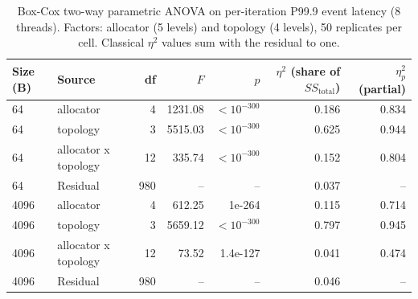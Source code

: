 \begin{table}[!htbp]
\centering
\footnotesize
\setlength{\tabcolsep}{3pt}
\caption{Box-Cox two-way parametric ANOVA on per-iteration P99.9 event latency (8 threads). Factors: allocator (5 levels) and topology (4 levels), 50 replicates per cell. Classical $\eta^2$ values sum with the residual to one.}
\label{tab:anova}
\begin{tabular}{llrrrrr}
\toprule
Size (B) & Source & df & $F$ & $p$ & $\eta^2$ (share of $SS_{\mathrm{total}}$) & $\eta_p^2$ (partial)\\
\midrule
64 & allocator & 4 & 1231.08 & $<10^{-300}$ & 0.186 & 0.834 \\
64 & topology & 3 & 5515.03 & $<10^{-300}$ & 0.625 & 0.944 \\
64 & allocator x topology & 12 & 335.74 & $<10^{-300}$ & 0.152 & 0.804 \\
64 & Residual & 980 & -- & -- & 0.037 & -- \\
4096 & allocator & 4 & 612.25 & 1e-264 & 0.115 & 0.714 \\
4096 & topology & 3 & 5659.12 & $<10^{-300}$ & 0.797 & 0.945 \\
4096 & allocator x topology & 12 & 73.52 & 1.4e-127 & 0.041 & 0.474 \\
4096 & Residual & 980 & -- & -- & 0.046 & -- \\
\bottomrule
\end{tabular}
\end{table}
